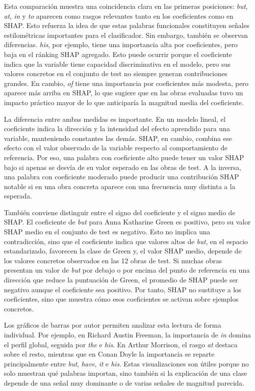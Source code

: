 \documentclass[IB]{TFUOC}%
\begin{document}
Esta comparación muestra una coincidencia clara en las primeras posiciones: \textit{but}, \textit{at}, \textit{in} y \textit{to} aparecen como rasgos relevantes tanto en los coeficientes como en SHAP. Esto refuerza la idea de que estas palabras funcionales constituyen señales estilométricas importantes para el clasificador. Sin embargo, también se observan diferencias. \textit{his}, por ejemplo, tiene una importancia alta por coeficientes, pero baja en el ránking SHAP agregado. Esto puede ocurrir porque el coeficiente indica que la variable tiene capacidad discriminativa en el modelo, pero sus valores concretos en el conjunto de test no siempre generan contribuciones grandes. En cambio, \textit{of} tiene una importancia por coeficientes más modesta, pero aparece más arriba en SHAP, lo que sugiere que en las obras evaluadas tuvo un impacto práctico mayor de lo que anticiparía la magnitud media del coeficiente.

La diferencia entre ambas medidas es importante. En un modelo lineal, el coeficiente indica la dirección y la intensidad del efecto aprendido para una variable, manteniendo constantes las demás. SHAP, en cambio, combina ese efecto con el valor observado de la variable respecto al comportamiento de referencia. Por eso, una palabra con coeficiente alto puede tener un valor SHAP bajo si apenas se desvía de su valor esperado en las obras de test. A la inversa, una palabra con coeficiente moderado puede producir una contribución SHAP notable si en una obra concreta aparece con una frecuencia muy distinta a la esperada.

También conviene distinguir entre el signo del coeficiente y el signo medio de SHAP. El coeficiente de \textit{but} para Anna Katharine Green es positivo, pero su valor SHAP medio en el conjunto de test es negativo. Esto no implica una contradicción, sino que el coeficiente indica que valores altos de \textit{but}, en el espacio estandarizado, favorecen la clase de Green y, el valor SHAP medio, depende de los valores concretos observados en las 12 obras de test. Si muchas obras presentan un valor de \textit{but} por debajo o por encima del punto de referencia en una dirección que reduce la puntuación de Green, el promedio de SHAP puede ser negativo aunque el coeficiente sea positivo. Por tanto, SHAP no sustituye a los coeficientes, sino que muestra cómo esos coeficientes se activan sobre ejemplos concretos.

Los gráficos de barras por autor permiten analizar esta lectura de forma individual. Por ejemplo, en Richard Austin Freeman, la importancia de \textit{in} domina el perfil global, seguida por \textit{the} e \textit{his}. En Arthur Morrison, el rasgo \textit{at} destaca sobre el resto, mientras que en Conan Doyle la importancia se reparte principalmente entre \textit{but}, \textit{have}, \textit{it} e \textit{his}. Estas visualizaciones son útiles porque no solo muestran qué palabras importan, sino también si la explicación de una clase depende de una señal muy dominante o de varias señales de magnitud parecida.
\end{document}

